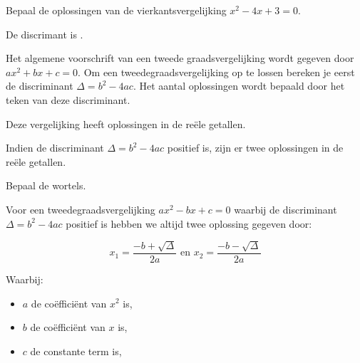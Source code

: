 \documentclass{ximera}
\begin{document}
\begin{exercise}

Bepaal de oplossingen van de vierkantsvergelijking \(x^2 - 4x + 3 = 0\).   

\begin{question}
De discrimant is \choicepositief. 

\begin{feedback}
    Het algemene voorschrift van een tweede graadsvergelijking wordt gegeven door  \(ax^2 + bx + c = 0\). 
    Om een tweedegraadsvergelijking op te lossen bereken je eerst de discriminant \(\Delta = b^2 - 4ac\). 
    Het aantal oplossingen wordt bepaald door het teken van deze discriminant. 
    
\end{feedback}
\end{question}

\begin{question}
    Deze vergelijking heeft \choicetwee oplossingen in de reële getallen. 
    \begin{feedback}
        Indien de discriminant \(\Delta = b^2 - 4ac\) positief is, zijn er twee oplossingen in de reële getallen. 
    \end{feedback}
\end{question}

\begin{question}
    Bepaal de wortels. 
    
    \begin{hint}
        
        Voor een tweedegraadsvergelijking  \(ax^2 - bx + c = 0\) waarbij de discriminant \( \Delta = b^2 - 4ac \) positief is hebben we altijd twee oplossing gegeven door: 
        
        \[
            x_{1} = \frac{-b + \sqrt{\Delta}}{2a}  \text{ en }  x_{2} = \frac{-b - \sqrt{\Delta}}{2a}
            \]
            
            Waarbij:
            \begin{itemize}
                \item \( a \) de coëfficiënt van \( x^2 \) is,
                \item \( b \) de coëfficiënt van \( x \) is,
                \item \( c \) de constante term is,
            \end{itemize}
            
    \end{hint}
    


\end{question}
\end{exercise}
\end{document}

